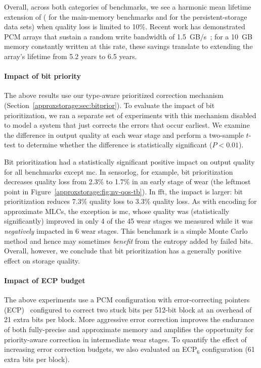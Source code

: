 \vskip 12pt
\noindent
Overall, across both categories of benchmarks, we see a harmonic mean
lifetime extension of 
( for the main-memory benchmarks and
 for
the persistent-storage data sets) when quality loss is limited to 10\%.
Recent work has demonstrated PCM arrays that sustain a random write bandwidth of
1.5~GB/s~\cite{moneta};
for a 10~GB memory constantly written at this rate,
these savings translate to extending the array's lifetime
from 5.2 years to 6.5 years.

\paragraph{Impact of bit priority} The above results use our type-aware
prioritized correction mechanism (Section~\ref{approxstorage:sec:bitprior}). To evaluate the
impact of bit prioritization, we ran a separate set of experiments with this
mechanism disabled to model a system that just corrects the errors that
occur earliest. We examine the difference in output quality at each wear stage and
perform a two-sample $t$-test to determine whether the difference is
statistically significant ($P < 0.01$).

Bit prioritization had a statistically significant positive impact on output
quality for all benchmarks except \textsf{mc}. In \textsf{sensorlog}, for example, bit
prioritization decreases quality loss from 2.3\% to 1.7\% in an early stage of
wear (the leftmost point in Figure~\ref{approxstorage:fig:nv-qos-tb}). In \textsf{fft}, the
impact is larger: bit prioritization reduces 7.3\% quality loss to
3.3\% quality loss. As with encoding for approximate MLCs, the exception is \textsf{mc}, whose quality was
(statistically significantly) improved in
only 4 of the 45 wear stages we measured while it was \emph{negatively}
impacted in 6 wear stages. This benchmark is a simple Monte Carlo method
and hence may sometimes \emph{benefit} from the entropy added by failed bits.
Overall, however, we conclude that bit prioritization has a generally positive
effect on storage quality.

\paragraph{Impact of ECP budget} The above experiments use a PCM configuration
with error-correcting pointers (ECP)~\cite{ecp} configured to correct two stuck
bits per 512-bit block at an overhead of 21 extra bits per block. More
aggressive error correction improves the endurance of both fully-precise and
approximate memory and amplifies the opportunity for priority-aware
correction in intermediate wear stages. To quantify the effect of increasing
error correction budgets, we also evaluated an ECP$_6$ configuration (61 extra
bits per block).

